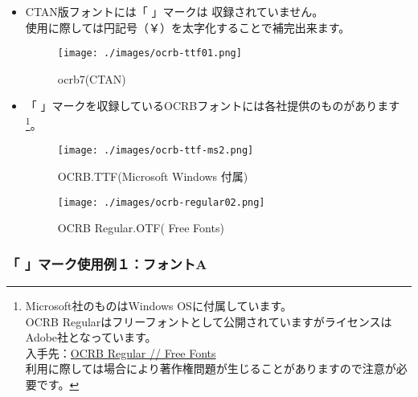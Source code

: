 \documentclass[a4paper,10pt,titlepage,pdfusetitle]{ltjsarticle}
\def\colH#1{\color[HTML]{#1}}
\begin{document}
{\begin{itemize}

  \item CTAN版フォントには「{ }」マークは 収録されていません。\\使用に際しては{\colH{800000}円記号（￥）を太字化}することで補完出来ます。\\
\vspace{-6mm}
\begin{figure}[H]
\centering
\texttt{[image: ./images/ocrb-ttf01.png]}
\caption{ocrb7(CTAN)} 
\end{figure}
\vspace{-6mm}

  \item 「{ }」マークを収録しているOCRBフォントには各社提供のものがあります\footnote{Microsoft社のものはWindows OSに付属しています。\\OCRB Regularはフリーフォントとして公開されていますがライセンスはAdobe社となっています。\\入手先：\href{https://freefonts.co/fonts/ocrb-regular}{OCRB Regular // Free Fonts}\\利用に際しては場合により著作権問題が生じることがありますので注意が必要です。}。

\vspace{-2mm}
  
\begin{figure}[H]
\centering
\texttt{[image: ./images/ocrb-ttf-ms2.png]}
\caption{OCRB.TTF(Microsoft Windows 付属)} 
\end{figure}
\vspace{-6mm}

\begin{figure}[H]
\centering
\texttt{[image: ./images/ocrb-regular02.png]}
\caption{OCRB Regular.OTF( Free Fonts)} 
\end{figure}

\end{itemize}

\subsubsection{「{ }」マーク使用例１：フォントA}

}
\end{document}
